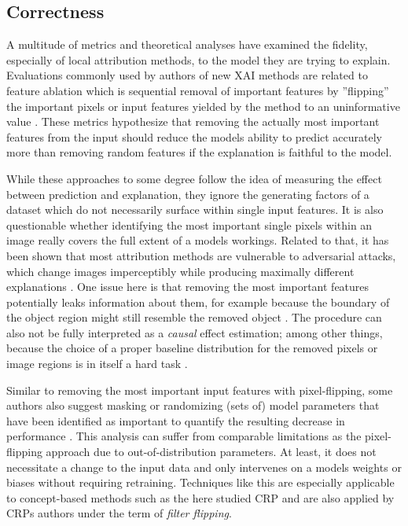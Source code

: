 \subsection{Correctness}
A multitude of metrics and theoretical analyses have examined the fidelity, especially of local attribution methods, to the model they are trying to explain. Evaluations commonly used by authors of new XAI methods are related to feature ablation which is sequential removal of important features by ''flipping'' the important pixels or input features yielded by the method to an uninformative value \cite{Samek2017a}. 
These metrics hypothesize that removing the actually most important features from the input should reduce the models ability to predict accurately more than removing random features if the explanation is faithful to the model.

While these approaches to some degree follow the idea of measuring the effect between prediction and explanation, they ignore the generating factors of a dataset which do not necessarily surface within single input features. It is also questionable whether identifying the most important single pixels within an image really covers the full extent of a models workings. Related to that, it has been shown that most attribution methods are vulnerable to adversarial attacks, which change images imperceptibly while producing maximally different explanations \cite{Ghorbani2019a, Anders2020, Dombrowski2022,Dombrowski2019}. One issue here is that removing the most important features potentially leaks information about them, for example because the boundary of the object region might still resemble the removed object \cite{Rong2022}.
The procedure can also not be fully interpreted as a \textit{causal} effect estimation; among other things, because the choice of a proper baseline distribution for the removed pixels or image regions is in itself a hard task \cite{Chang2019,Hooker2019, Popescu2021, Rong2022}. 

Similar to removing the most important input features with pixel-flipping, some authors also suggest masking or randomizing (sets of) model parameters that have been identified as important to quantify the resulting decrease in performance \cite{Ghorbani2019,Zhang2021,Achtibat2022, Fel2023}. 
This analysis can suffer from comparable limitations as the pixel-flipping approach due to out-of-distribution parameters. At least, it does not necessitate a change to the input data and only intervenes on a models weights or biases without requiring retraining.
Techniques like this are especially applicable to concept-based methods such as the here studied CRP and are also applied by CRPs authors under the term of \textit{filter flipping}. 

